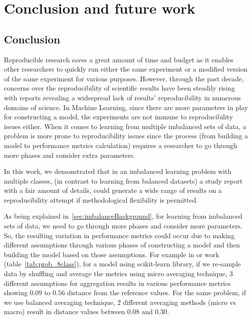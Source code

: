 \chapter{Conclusion and future work}
\section{Conclusion}
Reproducible research saves a great amount of time and budget as it enables other researchers to 
quickly run either the same experiment or a modified version of the same experiment for 
various purposes. However, through the past decade, concerns over the reproducibility of scientific 
results have been steadily rising with reports revealing a widespread lack of results’ reproducibility 
in numerous domains of science. In Machine Learning, since there are more parameters in play for 
constructing a model, the experiments are not immune to reproducibility issues either. When it comes 
to learning from multiple imbalanced sets of data, a problem is more prone to reproducibility issues 
since the process (from building a model to performance metrics calculation) requires a researcher 
to go through more phases and consider extra parameters.


In this work, we demonstrated that in an imbalanced learning problem with multiple classes,
(in contrast to learning from balanced datasets) a study report with a fair amount of details, 
could generate a wide range of results on a reproducibility attempt if methodological flexibility 
is permitted. 

As being explained in~\ref{sec:imbalanceBackground}, for learning from imbalanced sets of data, 
we need to go through more phases and consider more parameters. So, the resulting variation in 
performance metrics could occur due to making different assumptions through various phases of 
constructing a model and then building the model 
based on those assumptions. For example in or work (table~\ref{tab:prob_8class}), 
for a model using scikit-learn library, if we re-sample data by shuffling and average the metrics using 
micro averaging technique, 3 different assumptions for aggregation results in various performance 
metrics showing $0.09$ to $0.56$ distance from the reference values. For the same problem, if we use 
balanced averaging technique, 2 different averaging methods (micro vs macro) result in  
distance values between $0.08$ and $0.30$.

